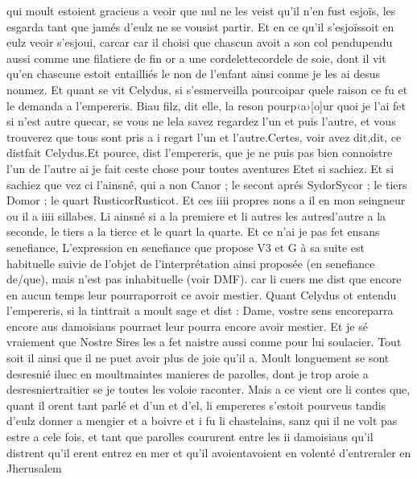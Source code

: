 \documentclass{article}
\begin{document}
\begin{pages}
   qui moult estoient gracieus a veoir que nul ne les veist qu’il n’en fust esjoïs, les esgarda tant que jamés d’eulz ne se vousist partir. 
   Et en ce qu’il s’esjoïssoit en eulz veoir 
   s'esjoui, carcar car il 
   choisi que chascun avoit a son col pendupendu aussi comme une filatiere de 
   fin or a une cordelettecordele de soie, dont il vit qu’en chascune estoit 
   entailliés le non de l’enfant ainsi conme je les ai desus nonmez. Et quant se 
   vit Celydus, 
   si s’esmerveilla pourcoipar quele raison ce fu et le demanda a 
   l’empereris.
   Biau filz, dit elle, 
      la reson pourp‹a›[o]ur quoi je l’ai fet si n’est autre 
      quecar, se vous ne 
      lela savez regardez l’un et puis l’autre, 
      et vous trouverez que tous sont pris a i regart l’un et l’autre.Certes, voir avez dit,dit, ce 
      distfait Celydus.Et pource, dist l’empereris, 
      que je ne puis pas bien connoistre l’un de l’autre ai je fait ceste chose pour toutes aventures 
      Etet si sachiez. Et 
      si sachiez que vez ci l’ainsné, qui a non Canor ; le secont aprés 
      SydorSycor ; 
      le tiers Domor ; le quart 
      RusticorRusticot. 
      Et ces iiii propres nons a il en mon seingneur ou il a iiii sillabes. 
      Li ainsné si a la premiere et li autres les autresl'autre a la seconde, 
         le tiers a la tierce et le quart la quarte. 
      Et ce n’ai je pas fet ensans senefiance,
      L'expression en senefiance que propose V3 et G à sa suite est habituelle suivie de l'objet de 
      l'interprétation ainsi proposée (en senefiance de/que), mais n'est pas inhabituelle (voir DMF). car li cuers me 
      dist que encore en aucun temps leur pourraporroit ce avoir mestier. \pend 
\pstart Quant Celydus ot entendu 
   l’empereris, si la tinttrait 
   a moult sage et dist :
   Dame, vostre sens encoreparra encore aus damoisiaus 
      pourraet leur pourra encore avoir mestier. Et je sé vraiement que Nostre Sires les 
      a fet naistre aussi conme pour lui soulacier. Tout soit il ainsi que il ne puet avoir plus de joie qu’il a. 
   Moult longuement se sont desresnié iluec en moultmaintes manieres 
   de parolles, dont je trop aroie a desresniertraitier se je 
   toutes les voloie raconter. 
   Mais a ce vient ore li contes que, quant il orent tant parlé et d’un et d’el, 
   li empereres 
   s’estoit pourveus tandis d’eulz donner a mengier et a boivre et i fu li chastelains, 
   sanz qui il ne volt pas estre a cele fois, et tant que parolles coururent entre les ii damoisiaus qu'il distrent 
   qu’il erent entrez en mer et qu’il avoientavoient en volenté 
   d’entreraler en Jherusalem 

\end{pages}
\end{document}
